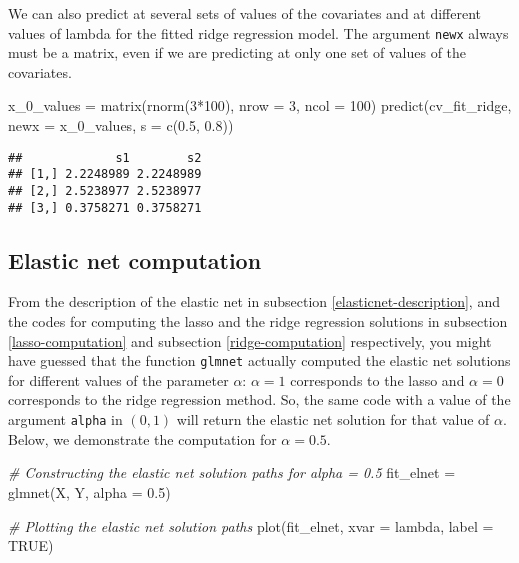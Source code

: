 \documentclass[
]{book}
\newenvironment{Shaded}{\begin{snugshade}}{\end{snugshade}}
\newcommand{\AttributeTok}[1]{\textcolor[rgb]{0.77,0.63,0.00}{#1}}
\newcommand{\CommentTok}[1]{\textcolor[rgb]{0.56,0.35,0.01}{\textit{#1}}}
\newcommand{\ConstantTok}[1]{\textcolor[rgb]{0.00,0.00,0.00}{#1}}
\newcommand{\DecValTok}[1]{\textcolor[rgb]{0.00,0.00,0.81}{#1}}
\newcommand{\FloatTok}[1]{\textcolor[rgb]{0.00,0.00,0.81}{#1}}
\newcommand{\FunctionTok}[1]{\textcolor[rgb]{0.00,0.00,0.00}{#1}}
\newcommand{\NormalTok}[1]{#1}
\newcommand{\OtherTok}[1]{\textcolor[rgb]{0.56,0.35,0.01}{#1}}
\newcommand{\SpecialCharTok}[1]{\textcolor[rgb]{0.00,0.00,0.00}{#1}}
\newcommand{\StringTok}[1]{\textcolor[rgb]{0.31,0.60,0.02}{#1}}
\begin{document}
We can also predict at several sets of values of the covariates and at different values of lambda for the fitted ridge regression model. The argument \texttt{newx} always must be a matrix, even if we are predicting at only one set of values of the covariates.

\begin{Shaded}
\begin{Highlighting}[]
\NormalTok{x\_0\_values }\OtherTok{=} \FunctionTok{matrix}\NormalTok{(}\FunctionTok{rnorm}\NormalTok{(}\DecValTok{3}\SpecialCharTok{*}\DecValTok{100}\NormalTok{), }\AttributeTok{nrow =} \DecValTok{3}\NormalTok{, }\AttributeTok{ncol =} \DecValTok{100}\NormalTok{)}
\FunctionTok{predict}\NormalTok{(cv\_fit\_ridge, }\AttributeTok{newx =}\NormalTok{ x\_0\_values, }\AttributeTok{s =} \FunctionTok{c}\NormalTok{(}\FloatTok{0.5}\NormalTok{, }\FloatTok{0.8}\NormalTok{))}
\end{Highlighting}
\end{Shaded}

\begin{verbatim}
##             s1        s2
## [1,] 2.2248989 2.2248989
## [2,] 2.5238977 2.5238977
## [3,] 0.3758271 0.3758271
\end{verbatim}

\hypertarget{elasticnet-computation}{%
\subsection{Elastic net computation}\label{elasticnet-computation}}

From the description of the elastic net in subsection \ref{elasticnet-description}, and the codes for computing the lasso and the ridge regression solutions in subsection \ref{lasso-computation} and subsection \ref{ridge-computation} respectively, you might have guessed that the function \texttt{glmnet} actually computed the elastic net solutions for different values of the parameter \(\alpha\): \(\alpha = 1\) corresponds to the lasso and \(\alpha = 0\) corresponds to the ridge regression method. So, the same code with a value of the argument \texttt{alpha} in \((0, 1)\) will return the elastic net solution for that value of \(\alpha\). Below, we demonstrate the computation for \(\alpha = 0.5\).

\begin{Shaded}
\begin{Highlighting}[]
\CommentTok{\# Constructing the elastic net solution paths for \textquotesingle{}alpha = 0.5\textquotesingle{}}
\NormalTok{fit\_elnet }\OtherTok{=} \FunctionTok{glmnet}\NormalTok{(X, Y, }\AttributeTok{alpha =} \FloatTok{0.5}\NormalTok{)}

\CommentTok{\# Plotting the elastic net solution paths}
\FunctionTok{plot}\NormalTok{(fit\_elnet, }\AttributeTok{xvar =} \StringTok{\textquotesingle{}lambda\textquotesingle{}}\NormalTok{, }\AttributeTok{label =} \ConstantTok{TRUE}\NormalTok{)}
\end{Highlighting}
\end{Shaded}
\end{document}
